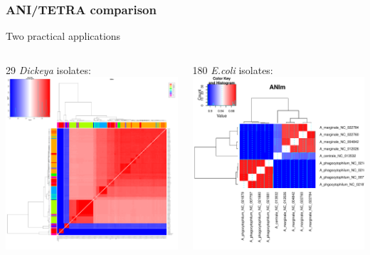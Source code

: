 \begin{frame}
  \frametitle{ANI/TETRA comparison}
  Two practical applications\\[0.25cm]
  \begin{columns}[T]
    \begin{column}{5cm}
    29 \textit{Dickeya} isolates:\\
      \includegraphics[width=1\textwidth]{images/ANIm_Ecoli}
    \end{column}
    \begin{column}{5cm}
    180 \textit{E.coli} isolates:\\
      \includegraphics[width=1\textwidth]{images/ANIm}

\end{column}
\end{columns}
\end{frame}
